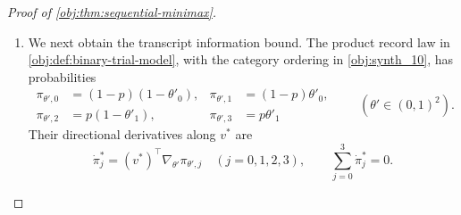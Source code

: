 \begin{proof}[Proof of \cref{obj:thm:sequential-minimax}]
\begin{enumerate}
For sufficiently large \(n\), define the prior-averaged information envelope
\[
\mathcal J_{n,R}
=
\int_{-R}^{R}
\overline w_R(a)G(\vartheta_n(a),t^*)\,da.
\]
The feasible weight set is compact: its row-normalization equations and nonnegative coordinates imply
\[
0\le\alpha_S\le1
\quad(S\in\mathcal S,\ \alpha\in\mathcal A_\varepsilon).
\]
Moreover, for interior \(\theta'\),
\[
1\le h_S(\theta')\le e^\varepsilon.
\]
Consequently, \(F_{\theta'}(\alpha,t^*)\) is jointly continuous in \((\theta',\alpha)\). Compactness gives continuity of its maximum, with
\[
|G(\theta',t^*)-G(\theta_0,t^*)|
\le
\max_{\alpha\in\mathcal A_\varepsilon}
|F_{\theta'}(\alpha,t^*)-F_{\theta_0}(\alpha,t^*)|.
\]
It follows that
\[
\sup_{|a|\le R}
|G(\vartheta_n(a),t^*)-J_0|
\longrightarrow0,
\qquad
\mathcal J_{n,R}\longrightarrow J_0.
\]
Equivalently, one may integrate the pointwise convergence using the eventual dominating function
\[
\bigl|\overline w_R(a)G(\vartheta_n(a),t^*)\bigr|
\le (|J_0|+1)\overline w_R(a).
\]

\item
We next obtain the transcript information bound. The product record law in \cref{obj:def:binary-trial-model}, with the category ordering in \cref{obj:synth_10}, has probabilities
\[
\begin{aligned}
\pi_{\theta',0}&=(1-p)(1-\theta'_0),&
\pi_{\theta',1}&=(1-p)\theta'_0,\\
\pi_{\theta',2}&=p(1-\theta'_1),&
\pi_{\theta',3}&=p\theta'_1
\end{aligned}
\qquad(\theta'\in(0,1)^2).
\]
Their directional derivatives along \(v^*\) are
\[
\dot\pi_j^*=(v^*)^\top\nabla_{\theta'}\pi_{\theta',j}
\quad(j=0,1,2,3),
\qquad
\sum_{j=0}^3\dot\pi_j^*=0.
\]


\end{enumerate}
\end{proof}
